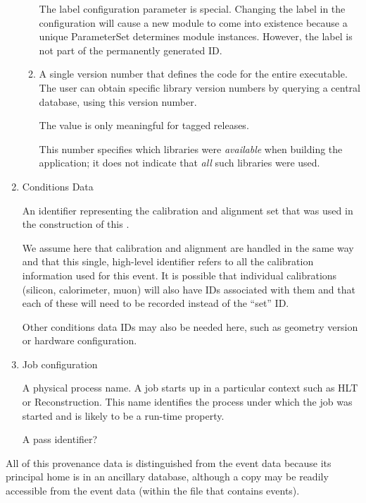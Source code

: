 \documentclass[draftmode]{memarticle}
\newcommand{\EDProduct}{\classname{ED\-Product}}
\begin{document}
\begin{enumerate}
\begin{enumerate}
    The label configuration parameter is special.
    Changing the label in the configuration will cause a new 
    module to come into existence because a unique ParameterSet
    determines module instances.  However, the label is not
    part of the permanently generated ID.

    \item

    A single version number
    that defines the code
    for the entire executable.
    The user can obtain specific library version numbers
    by querying a central database,
    using this version number.

    The value is only meaningful for tagged releases.

    This number specifies which libraries
    were \emph{available} when building the application;
    it does not indicate that \emph{all} such libraries were used.
    \end{enumerate}

  \item Conditions Data

    An identifier representing the calibration and alignment set
    that was used in the construction of this \EDProduct.

    We assume here that calibration and alignment are handled in the
    same way and that this single, high-level identifier refers to all the
    calibration information used for this event. It is possible that
    individual calibrations (\eg silicon, calorimeter, muon) will also
    have IDs associated with them and that each of these will need to
    be recorded instead of the ``set'' ID.

    Other conditions data IDs may also be needed here, such as
    geometry version or hardware configuration.

  \item Job configuration

    A physical process name.  A job starts up in a particular context
    such as HLT or Reconstruction. This name identifies the process
    under which the job was started and is likely to be a run-time
    property.

    \begin{fixme}
    A pass identifier?
    \end{fixme}

\end{enumerate}

All of this provenance data is distinguished from the event
data because its principal home is in an ancillary database,
although a copy may be readily accessible from the event data
(\eg within the file that contains events).
\end{document}
